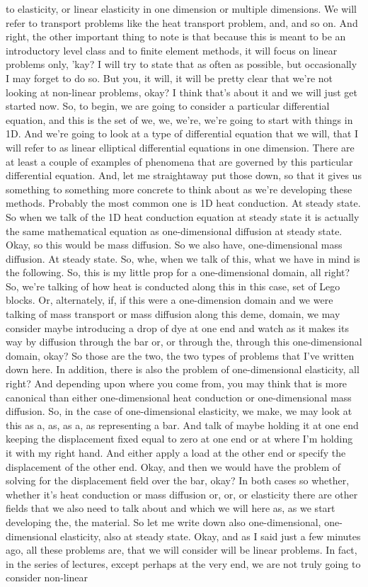 \documentclass[10pt]{article}
\begin{document}
to elasticity, or linear elasticity in one dimension or multiple dimensions. We will refer to transport problems like the heat transport problem, and, and so on. And right, the other important thing to note is that because this is meant to be an introductory level class and to finite element methods, it will focus on linear problems only, 'kay? I will try to state that as often as possible, but occasionally I may forget to do so. But you, it will, it will be pretty clear that we're not looking at non-linear problems, okay? I think that's about it and we will just get started now. So, to begin, we are going to  consider a particular differential equation, and this is the set of we, we, we're, we're going to start with things in 1D. And we're going to look at a type of differential equation that we will, that I will refer to as linear elliptical differential equations in one dimension. There are at least a couple of examples of phenomena that are governed by this particular differential equation. And, let me straightaway put those down, so that it gives us something to something more concrete to think about as we're developing these methods. Probably the most common one is 1D heat conduction. At steady state. So when we talk of the 1D heat conduction equation at steady state it is actually the same mathematical equation as one-dimensional diffusion at steady state. Okay, so this would be mass diffusion. So we also have, one-dimensional mass diffusion. At steady state. So, whe, when we talk of this, what we have in mind is the following. So, this is my little prop for a one-dimensional domain, all right? So, we're talking of how heat is conducted along this in this case, set of Lego blocks. Or, alternately, if, if this were a one-dimension domain and we were talking of mass transport or mass diffusion along this deme, domain, we may consider maybe introducing a drop of dye at one end and watch as it makes its way by diffusion through the bar or, or through the, through this one-dimensional domain, okay? So those are the two, the two types of problems that I've written down here. In addition, there is also the problem of one-dimensional elasticity, all right? And depending upon where you come from, you may think that is more canonical than either one-dimensional heat conduction or one-dimensional mass diffusion. So, in the case of one-dimensional elasticity, we make, we may look at this as a, as, as a, as representing a bar. And talk of maybe holding it at one end keeping the displacement fixed equal to zero at one end or at where I'm holding it with my right hand. And either apply a load at the other end or specify the displacement of the other end. Okay, and then we would have the problem of solving for the displacement field over the bar, okay? In both cases so whether, whether it's heat conduction or mass diffusion or, or, or elasticity there are other fields that we also need to talk about and which we will here as, as we start developing the, the material. So let me write down also one-dimensional, one-dimensional elasticity, also at steady state. Okay, and as I said just a few minutes ago, all these problems are, that we will consider will be linear problems. In fact, in the series of lectures, except perhaps at the very end, we are not truly going to consider non-linear 
\end{document}
